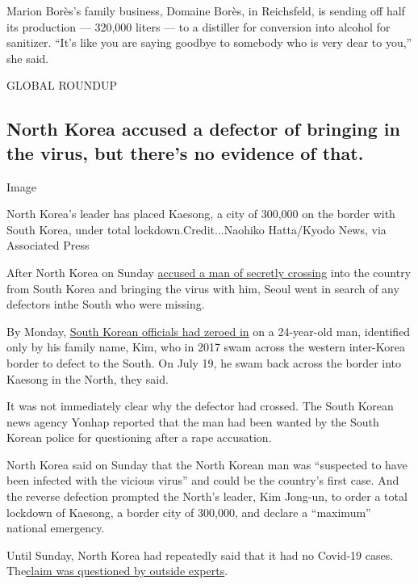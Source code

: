 Marion Borès's family business, Domaine Borès, in Reichsfeld, is sending
off half its production --- 320,000 liters --- to a distiller for
conversion into alcohol for sanitizer. ``It's like you are saying
goodbye to somebody who is very dear to you,'' she said.

GLOBAL ROUNDUP

\hypertarget{north-korea-accused-a-defector-of-bringing-in-the-virus-but-theres-no-evidence-of-that}{%
\subsection{North Korea accused a defector of bringing in the virus, but
there's no evidence of
that.}\label{north-korea-accused-a-defector-of-bringing-in-the-virus-but-theres-no-evidence-of-that}}

Image

North Korea's leader has placed Kaesong, a city of 300,000 on the border
with South Korea, under total lockdown.Credit...Naohiko Hatta/Kyodo
News, via Associated Press

After North Korea on Sunday
\href{https://www.nytimes3xbfgragh.onion/2020/07/25/world/asia/north-korea-coronavirus-kim-jong-un.html}{accused
a man of secretly crossing} into the country from South Korea and
bringing the virus with him, Seoul went in search of any defectors ​in
​the South who were missing.

By Monday,
\href{https://www.nytimes3xbfgragh.onion/2020/07/27/world/asia/north-korea-defector-coronavirus.html}{South
Korean officials had zeroed in} on a 24-year-old man, identified only by
his family name, Kim, who in 2017 swam across the western inter-Korea
border to defect to the South. On July 19, he swam back across the
border into Kaesong in the North, they said.

It was not immediately clear why the defector had crossed. The South
Korean news agency Yonhap reported that the man had been wanted by the
South Korean police for questioning after a rape accusation.

North Korea said on Sunday that the North Korean man was ``suspected to
have been infected with the vicious virus'' and could be the country's
first case. And the reverse defection prompted the North's leader, Kim
Jong-un, to order a total lockdown of Kaesong, a border city of 300,000,
and declare a ``maximum'' national emergency.

Until Sunday, North Korea had ​repeatedly ​said that it had no Covid-19
cases.
The\href{https://www.nytimes3xbfgragh.onion/2020/03/31/world/asia/north-korea-coronavirus.html?action=click\&module=RelatedLinks\&pgtype=Article}{claim
was questioned by outside experts}.


